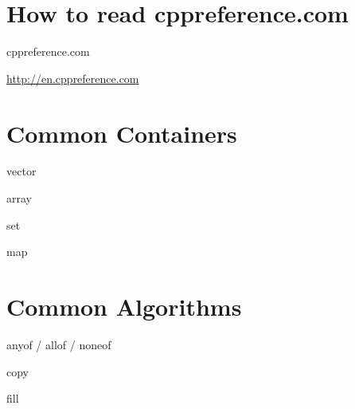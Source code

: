\documentclass[notes]{beamer}
\begin{document}
\section{How to read cppreference.com}

\begin{frame}{cppreference.com}
	\begin{center}
		\url{http://en.cppreference.com}
	\end{center}
\end{frame}


\section{Common Containers}

\begin{frame}{vector}

\end{frame}

\begin{frame}{array}

\end{frame}

\begin{frame}{set}

\end{frame}

\begin{frame}{map}

\end{frame}

\section{Common Algorithms}

\begin{frame}{any\textunderscore of / all\textunderscore of / none\textunderscore of}

\end{frame}

\begin{frame}{copy}

\end{frame}

\begin{frame}{fill}

\end{frame}
\end{document}
